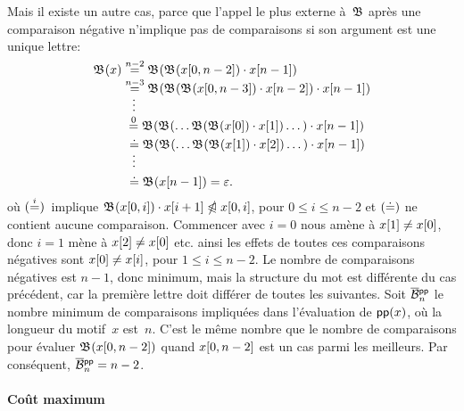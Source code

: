 Mais il existe un autre cas, parce que l'appel le plus externe
à~\(\mathfrak{B}\) après une comparaison négative n'implique pas de
comparaisons si son argument est une unique lettre:
\begin{align*}
\abovedisplayskip=0pt
\belowdisplayskip=0pt
\Border{}{x}
&\eqn{n-2} \Border{}{\Border{}{\ind{x}{0,n-2}} \cdot \ind{x}{n-1}}\\
&\eqn{n-3} \Border{}{\Border{}{\Border{}{\ind{x}{0,n-3}} \cdot
    \ind{x}{n-2}} \cdot \ind{x}{n-1}}\\
&\;\;\;\smash{\vdots}\\
&\;\mathrel{\stackrel{\smash[t]{0}}{=}}
  \Border{}{\Border{}{\ldots \Border{}{\Border{}{\ind{x}{0}} \cdot
        \ind{x}{1}} \dots} \cdot \ind{x}{n-1}}\\
&\,\,\doteq
  \Border{}{\Border{}{\ldots \Border{}{\Border{}{\ind{x}{1}} \cdot
            \ind{x}{2}} \dots} \cdot \ind{x}{n-1}}\\
&\;\;\;\smash{\vdots}\\
&\,\,\doteq \Border{}{\ind{x}{n-1}} = \varepsilon.
\end{align*}
où \((\smash{\mathrel{\stackrel{\smash{i}}{=}}})\)~implique \(\mathfrak{B}^{}({x}[{0,i}]) \cdot
{x}[{i+1}] \mathrel{\ntrianglelefteqslant} {x}[{0,i}]\), pour \(0 \leqslant i \leqslant
n-2\) et \((\smash{\doteq})\) ne contient aucune
comparaison. Commencer avec \(i=0\) nous amène à \({x}[{1}] \neq
{x}[{0}]\), donc \(i=1\) mène à \({x}[{2}] \neq {x}[{0}]\)
etc. ainsi les effets de toutes ces comparaisons négatives sont
\({x}[{0}] \neq {x}[{i}]\), pour \(1 \leqslant i \leqslant
n-2\). Le nombre de comparaisons négatives est \(n-1\), donc minimum,
mais la structure du mot est différente du cas précédent, car la
première lettre doit différer de toutes les suivantes. Soit
\(\OB{\fun{pp}}{n}\) le nombre minimum de
comparaisons impliquées dans l'évaluation de
\(\textsf{pp}(x)\), où la longueur du motif~\(x\)
est~\(n\). C'est le même nombre que le nombre de comparaisons pour
évaluer \(\mathfrak{B}^{}({x}[{0,n-2}])\) quand \({x}[{0,n-2}]\) est un
cas parmi les meilleurs. Par conséquent,
\(\OB{\fun{pp}}{n} = n - 2\).

\paragraph{Coût maximum}

